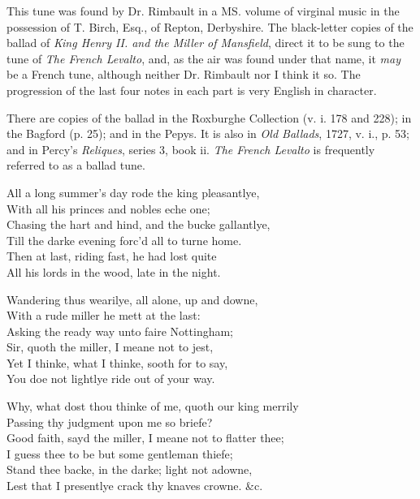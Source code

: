 
This tune was found by Dr. Rimbault in a MS. volume of virginal music in the
possession of T. Birch, Esq., of Repton, Derbyshire. The black-letter copies of
the ballad of \textit{King Henry II. and the Miller of Mansfield}, direct it to be sung to
the tune of \textit{The French Levalto}, and, as the air was found under that name, it
\textit{may} be a French tune, although neither Dr. Rimbault nor I think it so. The
progression of the last four notes in each part is very English in character.

There are copies of the ballad in the Roxburghe Collection (v. i. 178 and 228);
in the Bagford (p. 25); and in the Pepys. It is also in \textit{Old Ballads}, 1727,
v. i., p. 53; and in Percy’s \textit{Reliques}, series 3, book ii. \textit{The French Levalto} is
frequently referred to as a ballad tune.

\medskip


\pagebreak

\settowidth{\versewidth}{All a long summer’s day rode the king pleasantlye,}
\begin{scverse}
\begin{patverse}
All a long summer’s day rode the king pleasantlye,\\
With all his princes and nobles eche one;\\
Chasing the hart and hind, and the bucke gallantlye,\\
Till the darke evening forc’d all to turne home.\\
Then at last, riding fast, he had lost quite\\
All his lords in the wood, late in the night.
\end{patverse}

\begin{patverse}
Wandering thus wearilye, all alone, up and downe,\\
With a rude miller he mett at the last:\\
Asking the ready way unto faire Nottingham;\\
Sir, quoth the miller, I meane not to jest,\\
Yet I thinke, what I thinke, sooth for to say,\\
You doe not lightlye ride out of your way.
\end{patverse}

\begin{patverse}
Why, what dost thou thinke of me, quoth our king merrily\\
Passing thy judgment upon me so briefe?\\
Good faith, sayd the miller, I meane not to flatter thee;\\
I guess thee to be but some gentleman thiefe;\\
Stand thee backe, in the darke; light not adowne,\\
Lest that I presentlye crack thy knaves crowne. \&c.
\end{patverse}
\end{scverse}

